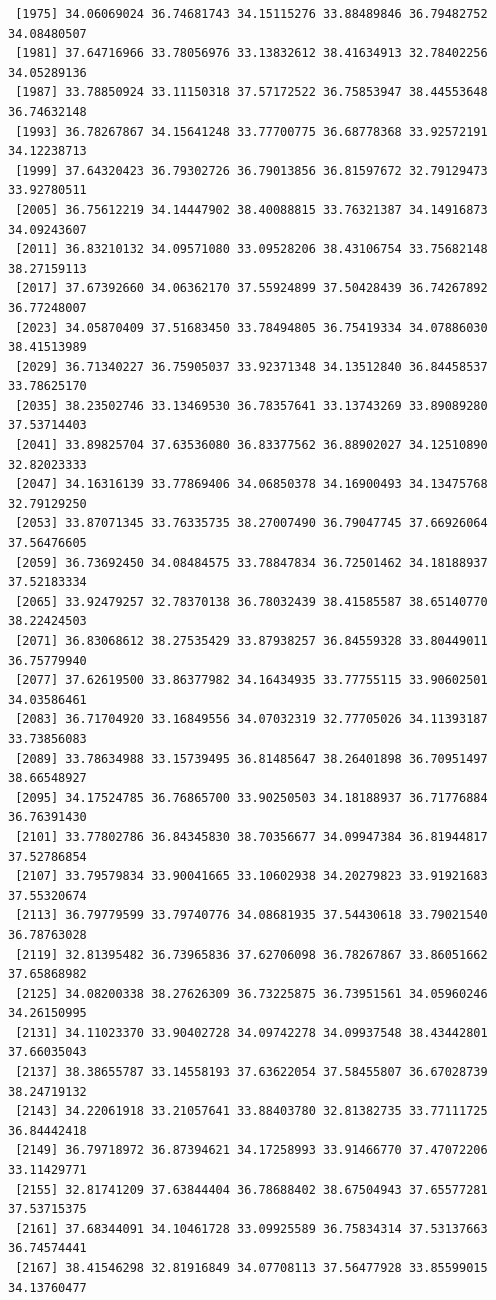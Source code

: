\documentclass[
  letterpaper,
  DIV=11,
  numbers=noendperiod]{scrartcl}
\begin{document}
\begin{verbatim}
 [1975] 34.06069024 36.74681743 34.15115276 33.88489846 36.79482752 34.08480507
 [1981] 37.64716966 33.78056976 33.13832612 38.41634913 32.78402256 34.05289136
 [1987] 33.78850924 33.11150318 37.57172522 36.75853947 38.44553648 36.74632148
 [1993] 36.78267867 34.15641248 33.77700775 36.68778368 33.92572191 34.12238713
 [1999] 37.64320423 36.79302726 36.79013856 36.81597672 32.79129473 33.92780511
 [2005] 36.75612219 34.14447902 38.40088815 33.76321387 34.14916873 34.09243607
 [2011] 36.83210132 34.09571080 33.09528206 38.43106754 33.75682148 38.27159113
 [2017] 37.67392660 34.06362170 37.55924899 37.50428439 36.74267892 36.77248007
 [2023] 34.05870409 37.51683450 33.78494805 36.75419334 34.07886030 38.41513989
 [2029] 36.71340227 36.75905037 33.92371348 34.13512840 36.84458537 33.78625170
 [2035] 38.23502746 33.13469530 36.78357641 33.13743269 33.89089280 37.53714403
 [2041] 33.89825704 37.63536080 36.83377562 36.88902027 34.12510890 32.82023333
 [2047] 34.16316139 33.77869406 34.06850378 34.16900493 34.13475768 32.79129250
 [2053] 33.87071345 33.76335735 38.27007490 36.79047745 37.66926064 37.56476605
 [2059] 36.73692450 34.08484575 33.78847834 36.72501462 34.18188937 37.52183334
 [2065] 33.92479257 32.78370138 36.78032439 38.41585587 38.65140770 38.22424503
 [2071] 36.83068612 38.27535429 33.87938257 36.84559328 33.80449011 36.75779940
 [2077] 37.62619500 33.86377982 34.16434935 33.77755115 33.90602501 34.03586461
 [2083] 36.71704920 33.16849556 34.07032319 32.77705026 34.11393187 33.73856083
 [2089] 33.78634988 33.15739495 36.81485647 38.26401898 36.70951497 38.66548927
 [2095] 34.17524785 36.76865700 33.90250503 34.18188937 36.71776884 36.76391430
 [2101] 33.77802786 36.84345830 38.70356677 34.09947384 36.81944817 37.52786854
 [2107] 33.79579834 33.90041665 33.10602938 34.20279823 33.91921683 37.55320674
 [2113] 36.79779599 33.79740776 34.08681935 37.54430618 33.79021540 36.78763028
 [2119] 32.81395482 36.73965836 37.62706098 36.78267867 33.86051662 37.65868982
 [2125] 34.08200338 38.27626309 36.73225875 36.73951561 34.05960246 34.26150995
 [2131] 34.11023370 33.90402728 34.09742278 34.09937548 38.43442801 37.66035043
 [2137] 38.38655787 33.14558193 37.63622054 37.58455807 36.67028739 38.24719132
 [2143] 34.22061918 33.21057641 33.88403780 32.81382735 33.77111725 36.84442418
 [2149] 36.79718972 36.87394621 34.17258993 33.91466770 37.47072206 33.11429771
 [2155] 32.81741209 37.63844404 36.78688402 38.67504943 37.65577281 37.53715375
 [2161] 37.68344091 34.10461728 33.09925589 36.75834314 37.53137663 36.74574441
 [2167] 38.41546298 32.81916849 34.07708113 37.56477928 33.85599015 34.13760477

\end{verbatim}
\end{document}
